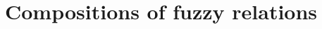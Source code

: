 \documentclass[review]{elsarticle}
\newcommand{\pkg}[1]{\textbf{#1}}
\newcommand{\code}[1]{\texttt{#1}}
\newcommand{\michal}[1]{{\color{green} MB: #1}}
\begin{document}
%
%
%


%
%
%
%
%
%








\section{Compositions of fuzzy relations}
\label{sec:compositions}
\end{document}

